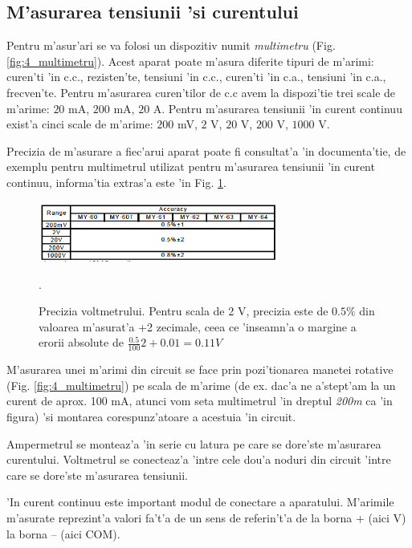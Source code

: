 \subsection{M'asurarea tensiunii 'si curentului}

Pentru m'asur'ari se va folosi un dispozitiv numit \textit{multimetru} (Fig. \ref{fig:4_multimetru}). Acest aparat poate m'asura diferite tipuri de m'arimi: curen'ti 'in c.c., rezisten'te, tensiuni 'in c.c., curen'ti 'in c.a., tensiuni 'in c.a., frecven'te. Pentru m'asurarea curen'tilor de c.c avem la dispozi'tie trei scale de m'arime: $20$ mA, $200$ mA, $20$ A. Pentru m'asurarea tensiunii 'in curent continuu exist'a cinci scale de m'arime: $200$ mV, $2$ V, $20$ V, $200$ V, $1000$ V. 

Precizia de m'asurare a fiec'arui aparat poate fi consultat'a 'in documenta'tie, de exemplu pentru multimetrul utilizat pentru m'asurarea tensiunii 'in curent continuu, informa'tia extras'a este 'in Fig. \ref{fig:acuratete_multimetru_tensiune}.
\begin{figure}
	\centering
		\includegraphics[width=0.7\textwidth]{figuri/acuratete_multimetru_tensiune}
	\caption{Precizia voltmetrului. Pentru scala de 2 V, precizia este de $0.5\%$ din valoarea m'asurat'a +2 zecimale, ceea ce 'inseamn'a o margine a erorii absolute de $\frac{0.5}{100}2+0.01=0.11 V$}.
	\label{fig:acuratete_multimetru_tensiune}
\end{figure}


M'asurarea unei m'arimi din circuit se face prin pozi'tionarea manetei rotative (Fig. \ref{fig:4_multimetru}) pe scala de m'arime (de ex. dac'a ne a'stept'am la un curent de aprox. 100 mA, atunci vom seta multimetrul 'in dreptul \textit{200m} ca 'in figura) 'si montarea corespunz'atoare a acestuia 'in circuit.


\begin{retine}
Ampermetrul se monteaz'a 'in serie cu latura pe care se dore'ste m'asurarea curentului. Voltmetrul se conecteaz'a 'intre cele dou'a noduri din circuit 'intre care se dore'ste m'asurarea tensiunii.

'In curent continuu este important modul de conectare a aparatului. M'arimile m'asurate reprezint'a valori fa't'a de un sens de referin't'a de la borna + (aici V) la borna -- (aici COM).
\end{retine}

